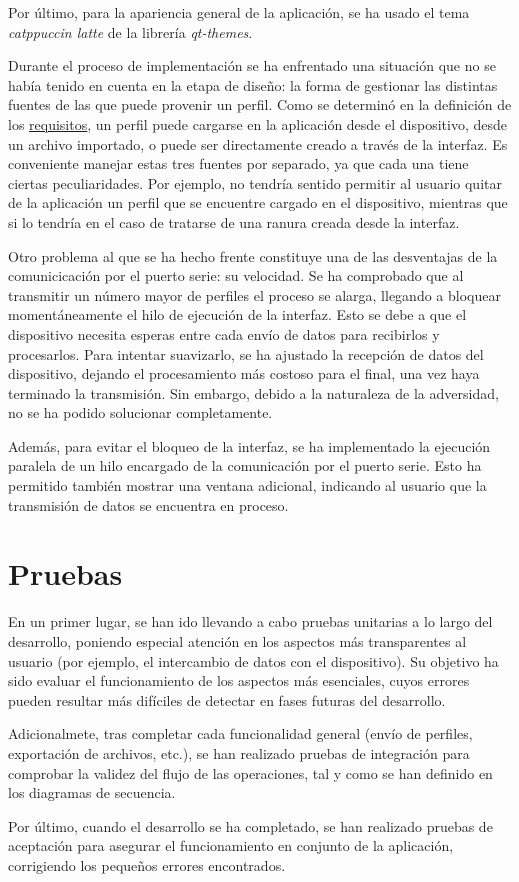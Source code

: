 Por último, para la apariencia general de la aplicación, se ha usado el tema \textit{catppuccin latte} de la librería \textit{qt-themes}\cite{qtthemes-lib}.

Durante el proceso de implementación se ha enfrentado una situación que no se había tenido en cuenta en la etapa de diseño: la forma de gestionar las distintas fuentes de las que puede provenir un perfil. Como se determinó en la definición de los \hyperref[subsub:ui_requisitos]{requisitos}, un perfil puede cargarse en la aplicación desde el dispositivo, desde un archivo importado, o puede ser directamente creado a través de la interfaz. Es conveniente manejar estas tres fuentes por separado, ya que cada una tiene ciertas peculiaridades. Por ejemplo, no tendría sentido permitir al usuario quitar de la aplicación un perfil que se encuentre cargado en el dispositivo, mientras que si lo tendría en el caso de tratarse de una ranura creada desde la interfaz.

Otro problema al que se ha hecho frente constituye una de las desventajas de la comunicicación por el puerto serie: su velocidad. Se ha comprobado que al transmitir un número mayor de perfiles el proceso se alarga, llegando a bloquear momentáneamente el hilo de ejecución de la interfaz. Esto se debe a que el dispositivo necesita esperas entre cada envío de datos para recibirlos y procesarlos. Para intentar suavizarlo, se ha ajustado la recepción de datos del dispositivo, dejando el procesamiento más costoso para el final, una vez haya terminado la transmisión. Sin embargo, debido a la naturaleza de la adversidad, no se ha podido solucionar completamente.

Además, para evitar el bloqueo de la interfaz, se ha implementado la ejecución paralela de un hilo encargado de la comunicación por el puerto serie. Esto ha permitido también mostrar una ventana adicional, indicando al usuario que la transmisión de datos se encuentra en proceso.

\section{Pruebas}

En un primer lugar, se han ido llevando a cabo pruebas unitarias a lo largo del desarrollo, poniendo especial atención en los aspectos más transparentes al usuario (por ejemplo, el intercambio de datos con el dispositivo). Su objetivo ha sido evaluar el funcionamiento de los aspectos más esenciales, cuyos errores pueden resultar más difíciles de detectar en fases futuras del desarrollo.

Adicionalmete, tras completar cada funcionalidad general (envío de perfiles, exportación de archivos, etc.), se han realizado pruebas de integración para comprobar la validez del flujo de las operaciones, tal y como se han definido en los diagramas de secuencia.


Por último, cuando el desarrollo se ha completado, se han realizado pruebas de aceptación para asegurar el funcionamiento en conjunto de la aplicación, corrigiendo los pequeños errores encontrados.
